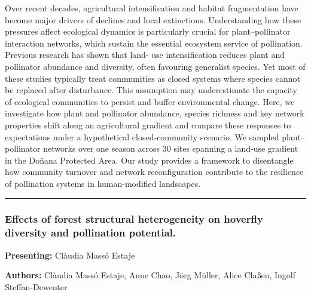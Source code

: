 \documentclass[
  letterpaper,
  DIV=11,
  numbers=noendperiod]{scrartcl}
\begin{document}
Over recent decades, agricultural intensification and habitat
fragmentation have become major drivers of declines and local
extinctions. Understanding how these pressures affect ecological
dynamics is particularly crucial for plant--pollinator interaction
networks, which sustain the essential ecosystem service of pollination.
Previous research has shown that land- use intensification reduces plant
and pollinator abundance and diversity, often favouring generalist
species. Yet most of these studies typically treat communities as closed
systems where species cannot be replaced after disturbance. This
assumption may underestimate the capacity of ecological communities to
persist and buffer environmental change. Here, we investigate how plant
and pollinator abundance, species richness and key network properties
shift along an agricultural gradient and compare these responses to
expectations under a hypothetical closed-community scenario. We sampled
plant--pollinator networks over one season across 30 sites spanning a
land-use gradient in the Doñana Protected Area. Our study provides a
framework to disentangle how community turnover and network
reconfiguration contribute to the resilience of pollination systems in
human-modified landscapes.

\begin{center}\rule{0.5\linewidth}{0.5pt}\end{center}

\subsubsection{Effects of forest structural heterogeneity on hoverfly
diversity and pollination
potential.}\label{effects-of-forest-structural-heterogeneity-on-hoverfly-diversity-and-pollination-potential.}

\textbf{Presenting:} Clàudia Massó Estaje

\textbf{Authors:} Clàudia Massó Estaje, Anne Chao, Jörg Müller, Alice
Claßen, Ingolf Steffan-Dewenter
\end{document}

